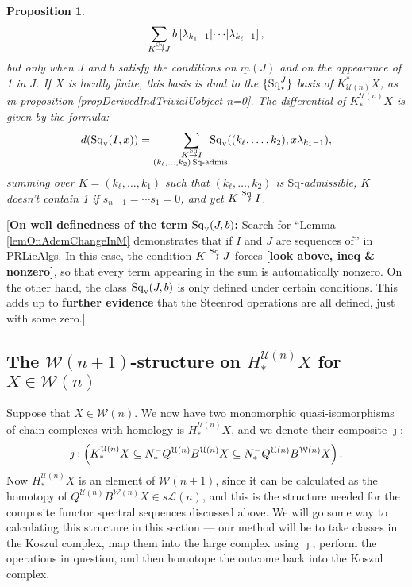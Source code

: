 \documentclass[11pt]{amsart}
\theoremstyle{plain}
\newtheorem{prop}[thm]{Proposition}
\theoremstyle{definition}
\newcommand{\calW}{\mathcal{W}}
\newcommand{\calU}{\mathcal{U}}
\newcommand{\calL}{\mathcal{L}}
\theoremstyle{plain}
\newcommand{\minDimSq}{\underline{m}}
\newcommand{\produces}[3]{#3:#1\sim #2}
\renewcommand{\produces}[3]{#1\rightarrow_{#3} #2}%
\renewcommand{\produces}[3]{#1\overset{\smash{#3}}{\rightarrow} #2}%
\newcommand{\Nop}{N^{\smash{-}}}
\newcommand{\Sq}{\mathrm{Sq}}
\newcommand{\Sqv}{\mathrm{Sq}_\textup{v}}
\begin{document}
\begin{Koszul complexes}
\begin{prop}
\[\sum_{\produces{K}{J}{\Sq}}b\left[\lambda_{k_1-1} \middle|\cdots\middle|\lambda_{k_\ell-1} \right],\]
but only when $J$ and $b$ satisfy the conditions on $\minDimSq(J)$ and on the appearance of 1 in $J$.
If $X$ is locally finite, this basis is dual to the $\{\Sq_\textup{v}^J\}$ basis of $K^*_{\calU(n)}X$, as in proposition \ref{propDerivedIndTrivialUobject n=0}. The differential of $K^{\calU(n)}_*X$ is given by the formula:
\[d(\Sqv(I,x))=\sum_{ \substack{\produces{K}{I}{\Sq}\\(k_{\ell},\ldots,k_2){\,\Sq\textup{-admis.}}}}\!\!\!\!\!\!\!\!\!\!\!\! \Sqv((k_{\ell},\ldots,k_2),x\lambda_{k_1-1}),\]
summing over $K=(k_{\ell},\ldots,k_1)$ such that $(k_{\ell},\ldots,k_2)$ is $\Sq$-admissible, $K$ doesn't contain 1 if $s_{n-1}=\cdots s_1=0$, and yet $\produces{K}{I}{\Sq}$.
\end{prop}
[\textbf{On well definedness of the term $\Sqv(J,b)$:} {Search for }``Lemma \ref{lemOnAdemChangeInM} demonstrates that if $I$ and $J$ are sequences of'' in PRLieAlgs.
In this case, the condition $\produces{K}{J}{\Sq}$ forces \textbf{[look above, ineq \& nonzero]}, so that every term appearing in the sum is automatically nonzero. On the other hand, the class $\Sq_\textup{v}(J,b)$ is only defined under certain conditions. This adds up to \textbf{further evidence} that the Steenrod operations are all defined, just with some zero.]
\subsection{The $\calW(n+1)$-structure on $H_*^{\calU(n)}X$ for $X\in\calW(n)$}\label{section on structure on homology of koszul cx}
Suppose that $X\in\calW(n)$. We now have two monomorphic quasi-isomorphisms of chain complexes with homology is $H_*^{\calU(n)}X$, and we denote their composite $\jmath$:
\[\jmath:\left(K_*^{\calU(n)}X\subseteq \Nop_*Q^{\calU(n)}B^{\calU(n)}X\subseteq \Nop_*Q^{\calU(n)}B^{\calW(n)}X\right).\]
Now $H^{\calU(n)}_*X$ is an element of $\calW(n+1)$, since it can be calculated as the homotopy of $Q^{\calU(n)}B^{\calW(n)}X\in s\calL(n)$, and this is the structure needed for the composite functor spectral sequences discussed above. We will go some way to calculating this structure in this section --- our method will be to take classes in the Koszul complex, map them into the large complex using $\jmath$, perform the operations in question, and then homotope the outcome back into the Koszul complex.


\end{Koszul complexes}
\end{document}
